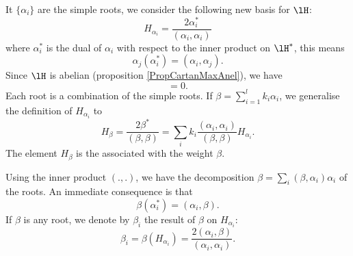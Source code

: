 
It $\{ \alpha_i \}$ are the simple roots, we consider the following new basis for $\lH$:
\begin{equation}
    H_{\alpha_i}=\frac{ 2\alpha_i^* }{ (\alpha_i,\alpha_i) }
\end{equation}
where $\alpha_i^*$ is the dual of $\alpha_i$ with respect to the inner product on \( \lH^*\), this means
\begin{equation}
    \alpha_j(\alpha_i^*)=(\alpha_i,\alpha_j).
\end{equation}
Since \( \lH\) is abelian (proposition \ref{PropCartanMaxAnel}), we have
\begin{equation}
    [H_{\alpha_i},H_{\alpha_j}]=0.
\end{equation}
Each root is a combination of the simple roots. If $\beta=\sum_{i=1}^lk_i\alpha_i$, we generalise the definition of $H_{\alpha_i}$ to
\begin{equation}
    H_{\beta}=\frac{ 2\beta^* }{ (\beta,\beta) }=\sum_i k_i\frac{ (\alpha_i,\alpha_i) }{ (\beta,\beta) }H_{\alpha_i}.
\end{equation}
The element $H_{\beta}$ is the  associated with the weight $\beta$.

Using the inner product $(.,.)$, we have the decomposition $\beta=\sum_i(\beta,\alpha_i)\alpha_i$ of the roots. An immediate consequence is that 
\begin{equation}
    \beta(\alpha_i^*)=(\alpha_i,\beta).
\end{equation}
If $\beta$ is any root, we denote by $\beta_i$ the result of $\beta$ on $H_{\alpha_i}$:
\begin{equation}            \label{EqbetaialphaiH}
    \beta_i=\beta(H_{\alpha_i})=\frac{ 2(\alpha_i,\beta) }{ (\alpha_i,\alpha_i) }.
\end{equation}


